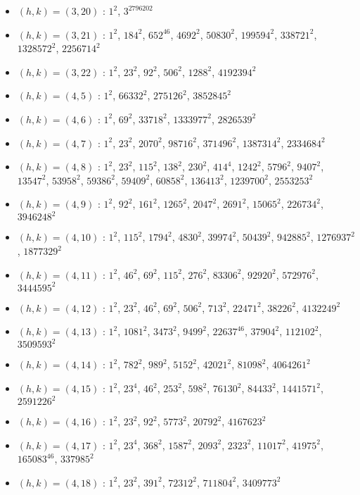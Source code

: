 \begin{itemize}
\item $(h,k)=(3,20)$ : $1^{2}$, $3^{2796202}$
\item $(h,k)=(3,21)$ : $1^{2}$, $184^{2}$, $652^{46}$, $4692^{2}$, $50830^{2}$, $199594^{2}$, $338721^{2}$, $1328572^{2}$, $2256714^{2}$
\item $(h,k)=(3,22)$ : $1^{2}$, $23^{2}$, $92^{2}$, $506^{2}$, $1288^{2}$, $4192394^{2}$
\item $(h,k)=(4,5)$ : $1^{2}$, $66332^{2}$, $275126^{2}$, $3852845^{2}$
\item $(h,k)=(4,6)$ : $1^{2}$, $69^{2}$, $33718^{2}$, $1333977^{2}$, $2826539^{2}$
\item $(h,k)=(4,7)$ : $1^{2}$, $23^{2}$, $2070^{2}$, $98716^{2}$, $371496^{2}$, $1387314^{2}$, $2334684^{2}$
\item $(h,k)=(4,8)$ : $1^{2}$, $23^{2}$, $115^{2}$, $138^{2}$, $230^{2}$, $414^{4}$, $1242^{2}$, $5796^{2}$, $9407^{2}$, $13547^{2}$, $53958^{2}$, $59386^{2}$, $59409^{2}$, $60858^{2}$, $136413^{2}$, $1239700^{2}$, $2553253^{2}$
\item $(h,k)=(4,9)$ : $1^{2}$, $92^{2}$, $161^{2}$, $1265^{2}$, $2047^{2}$, $2691^{2}$, $15065^{2}$, $226734^{2}$, $3946248^{2}$
\item $(h,k)=(4,10)$ : $1^{2}$, $115^{2}$, $1794^{2}$, $4830^{2}$, $39974^{2}$, $50439^{2}$, $942885^{2}$, $1276937^{2}$, $1877329^{2}$
\item $(h,k)=(4,11)$ : $1^{2}$, $46^{2}$, $69^{2}$, $115^{2}$, $276^{2}$, $83306^{2}$, $92920^{2}$, $572976^{2}$, $3444595^{2}$
\item $(h,k)=(4,12)$ : $1^{2}$, $23^{2}$, $46^{2}$, $69^{2}$, $506^{2}$, $713^{2}$, $22471^{2}$, $38226^{2}$, $4132249^{2}$
\item $(h,k)=(4,13)$ : $1^{2}$, $1081^{2}$, $3473^{2}$, $9499^{2}$, $22637^{46}$, $37904^{2}$, $112102^{2}$, $3509593^{2}$
\item $(h,k)=(4,14)$ : $1^{2}$, $782^{2}$, $989^{2}$, $5152^{2}$, $42021^{2}$, $81098^{2}$, $4064261^{2}$
\item $(h,k)=(4,15)$ : $1^{2}$, $23^{4}$, $46^{2}$, $253^{2}$, $598^{2}$, $76130^{2}$, $84433^{2}$, $1441571^{2}$, $2591226^{2}$
\item $(h,k)=(4,16)$ : $1^{2}$, $23^{2}$, $92^{2}$, $5773^{2}$, $20792^{2}$, $4167623^{2}$
\item $(h,k)=(4,17)$ : $1^{2}$, $23^{4}$, $368^{2}$, $1587^{2}$, $2093^{2}$, $2323^{2}$, $11017^{2}$, $41975^{2}$, $165083^{46}$, $337985^{2}$
\item $(h,k)=(4,18)$ : $1^{2}$, $23^{2}$, $391^{2}$, $72312^{2}$, $711804^{2}$, $3409773^{2}$

\end{itemize}
